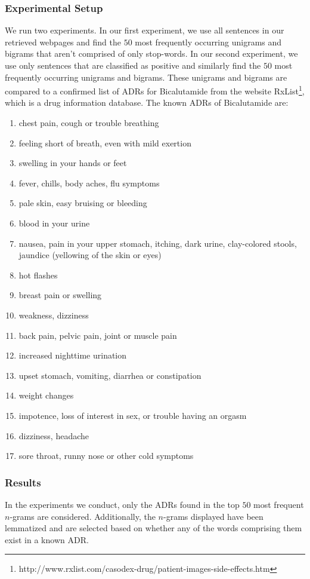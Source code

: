 \documentclass{acm_proc_article-sp}
\begin{document}
\subsubsection{Experimental Setup}
We run two experiments. In our first experiment, we use all sentences in our retrieved webpages and find the $50$ most frequently occurring unigrams and bigrams that aren't comprised of only stop-words. In our second experiment, we use only sentences that are classified as positive and similarly find the $50$ most frequently occurring unigrams and bigrams. These unigrams and bigrams are compared to a confirmed list of ADRs for Bicalutamide from the website RxList\footnote{http://www.rxlist.com/casodex-drug/patient-images-side-effects.htm}, which is a drug information database. The known ADRs of Bicalutamide are:
\vspace{-3mm}
\begin{enumerate}
\setlength\itemsep{0.2em}
\item chest pain, cough or trouble breathing
\item feeling short of breath, even with mild exertion
\item swelling in your hands or feet
\item fever, chills, body aches, flu symptoms
\item pale skin, easy bruising or bleeding
\item blood in your urine
\item nausea, pain in your upper stomach, itching, dark urine, clay-colored stools, jaundice (yellowing of the skin or eyes)
\item hot flashes
\item breast pain or swelling
\item weakness, dizziness
\item back pain, pelvic pain, joint or muscle pain
\item increased nighttime urination
\item upset stomach, vomiting, diarrhea or constipation
\item weight changes
\item impotence, loss of interest in sex, or trouble having an orgasm
\item dizziness, headache
\item sore throat, runny nose or other cold symptoms
\end{enumerate} 

\subsubsection{Results}
In the experiments we conduct, only the ADRs found in the top $50$ most frequent $n$-grams are considered. Additionally, the $n$-grams displayed have been lemmatized and are selected based on whether any of the words comprising them exist in a known ADR.
\end{document}
